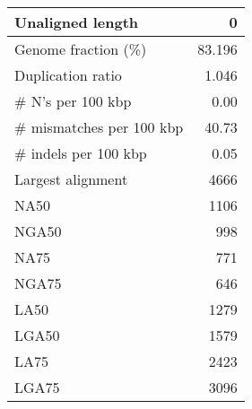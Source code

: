 \documentclass[12pt,a4paper]{article}
\begin{document}
\begin{table}[ht]
\begin{center}
\begin{tabular}{|l*{1}{|r}|}
Unaligned length & 0 \\ \hline
Genome fraction (\%) & 83.196 \\ \hline
Duplication ratio & 1.046 \\ \hline
\# N's per 100 kbp & 0.00 \\ \hline
\# mismatches per 100 kbp & 40.73 \\ \hline
\# indels per 100 kbp & 0.05 \\ \hline
Largest alignment & 4666 \\ \hline
NA50 & 1106 \\ \hline
NGA50 & 998 \\ \hline
NA75 & 771 \\ \hline
NGA75 & 646 \\ \hline
LA50 & 1279 \\ \hline
LGA50 & 1579 \\ \hline
LA75 & 2423 \\ \hline
LGA75 & 3096 \\ \hline
\end{tabular}
\end{center}
\end{table}
\end{document}

